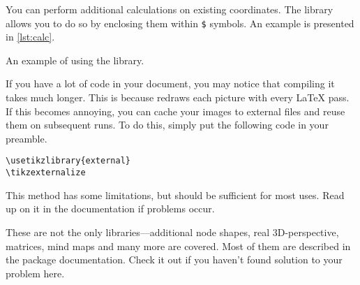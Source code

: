 You can perform additional calculations on existing
coordinates. The  library allows you to do so by enclosing them
within \verb|$| symbols. An example is presented in
\autoref{lst:calc}.

\begin{listing}
  \begin{example}[vertical_mode, examplewidth=0.8\linewidth]
\usetikzlibrary{calc}

\end{example}
  \caption{An example of using the  library.}\label{lst:calc}
\end{listing}

If you have a lot of \TikZ{} code in your document, you may notice that
compiling it takes much longer. This is because
\TikZ{} redraws each picture with every \LaTeX{} pass. If this becomes
annoying, you can cache your images to external files and reuse them on
subsequent runs. To do this, simply put the following code in your preamble.
\begin{verbatim}
\usetikzlibrary{external}
\tikzexternalize
\end{verbatim}
This method has some limitations, but should be sufficient for most uses. Read
up on it in the documentation if problems occur.

These are not the only libraries---additional node shapes, real 3D-perspective,
matrices, mind maps and many more are covered. Most of them are described in
the  package documentation. Check it out if you haven't found
solution to your problem here.

